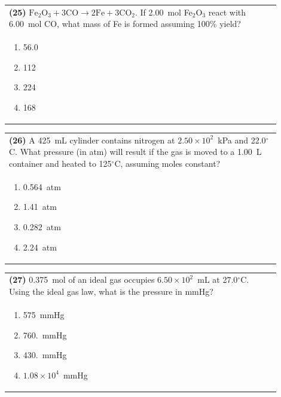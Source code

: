 \documentclass{article}
\begin{document}
{{\newpage

\noindent\begin{tabular}{|p{0.9\linewidth}|}
\hline
\textbf{(25)} $\text{Fe}_2\text{O}_3 + 3\text{CO} \rightarrow 2\text{Fe} + 3\text{CO}_2$. If 2.00~mol Fe$_2$O$_3$ react with 6.00~mol CO, what mass of Fe is formed assuming 100\% yield?\\[0.2cm]

\begin{minipage}[t]{0.85\linewidth}
\begin{enumerate}[label=\alph*.]
\item 56.0
\item 112
\item 224
\item 168
\end{enumerate}
\end{minipage}\\[0.2cm]
\hline
\end{tabular}

\vspace{0.2cm}
\noindent\begin{tabular}{|p{0.9\linewidth}|}
\hline
\textbf{(26)} A 425~mL cylinder contains nitrogen at $2.50\times10^{2}$~kPa and 22.0$^\circ$C. What pressure (in atm) will result if the gas is moved to a 1.00~L container and heated to 125$^\circ$C, assuming moles constant?\\[0.2cm]

\begin{minipage}[t]{0.85\linewidth}
\begin{enumerate}[label=\alph*.]
\item 0.564~atm
\item 1.41~atm
\item 0.282~atm
\item 2.24~atm
\end{enumerate}
\end{minipage}\\[0.2cm]
\hline
\end{tabular}

\vspace{0.2cm}
\noindent\begin{tabular}{|p{0.9\linewidth}|}
\hline
\textbf{(27)} 0.375~mol of an ideal gas occupies $6.50\times10^{2}$~mL at 27.0$^\circ$C. Using the ideal gas law, what is the pressure in mmHg? \\[0.2cm]

\begin{minipage}[t]{0.85\linewidth}
\begin{enumerate}[label=\alph*.]
\item 575~mmHg
\item 760.~mmHg
\item 430.~mmHg
\item $1.08\times10^{4}$~mmHg
\end{enumerate}
\end{minipage}\\[0.2cm]
\hline
\end{tabular}

}}
\end{document}
